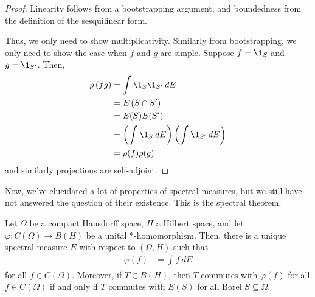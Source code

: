 \documentclass[10pt]{mypackage}
\begin{document}
\begin{proof}
  Linearity follows from a bootstrapping argument, and boundedness from the definition of the sesquilinear form.

  Thus, we only need to show multiplicativity. Similarly from bootstrapping, we only need to show the case when $f$ and $g$ are simple. Suppose $f = \1_{S}$ and $g = \1_{S'}$. Then,
  \begin{align*}
    \rho\left( fg \right) &= \int_{}^{} \1_{S}\1_{S'}\:dE\\
                             &= E\left( S\cap S' \right)\\
                             &= E(S)E(S')\\
                             &= \left( \int_{}^{} \1_{S}\:dE \right)\left( \int_{}^{} \1_{S'}\:dE \right)\\
                             &= \rho(f)\rho(g)
  \end{align*}
  and similarly projections are self-adjoint.
\end{proof}
Now, we've elucidated a lot of properties of spectral measures, but we still have not answered the question of their existence. This is the spectral theorem.
\begin{theorem}
  Let $\Omega$ be a compact Hausdorff space, $H$ a Hilbert space, and let $\varphi\colon C(\Omega)\rightarrow B(H)$ be a unital $\ast$-homomorphism. Then, there is a unique spectral measure $E$ with respect to $\left( \Omega,H \right)$ such that
  \begin{align*}
    \varphi(f) &= \int_{}^{} f\:dE
  \end{align*}
  for all $f\in C(\Omega)$. Moreover, if $T\in B(H)$, then $T$ commutes with $\varphi(f)$ for all $f\in C(\Omega)$ if and only if $T$ commutes with $E(S)$ for all Borel $S\subseteq \Omega$.
\end{theorem}
\end{document}
